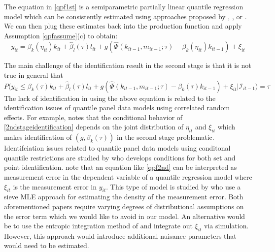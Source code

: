 \documentclass[11pt]{article}
\begin{document}
The equation in \eqref{qpf1st} is a semiparametric partially linear quantile regression model which can be consistently estimated using approaches proposed by \cite{Lee2003}, \cite{KOENKER1994}, or \cite{Chen2009}. We can then plug these estimates back into the production function and apply Assumption \eqref{qpfassume}(c) to obtain:
\begin{equation} \label{qpf2nd}
y_{it}=\beta_{k}(\eta_{it})k_{it}+\hat{\beta}_{l}(\tau)l_{it}+g(\hat{\Phi}(k_{it-1}, m_{it-1}; \tau)-\beta_{k}(\eta_{it})k_{it-1})+\xi_{it}
\end{equation}

The main challenge of the identification result in the second stage is that it is not true in general that
\begin{equation} \label{2ndstageidentification}
P\big(y_{it}\leq \beta_{k}(\tau)k_{it}+\hat{\beta}_{l}(\tau)l_{it}+g(\hat{\Phi}(k_{it-1}, m_{it-1}; \tau)-\beta_{k}(\tau)k_{it-1})+\xi_{it}|\mathcal{I}_{it-1}\big)=\tau
\end{equation}
The lack of identification in using the above equation is related to the identification issues of quantile panel data models using correlated random effects. For example, \cite{Canay2011} notes that the conditional behavior of \eqref{2ndstageidentification} depends on the joint distribution of $\eta_{it}$ and $\xi_{it}$ which makes identification of $(g, \beta_{k}(\tau))$ in the second stage problematic. Identifciation issues related to quantile panel data models using conditonal quantile restrictions are studied by \cite{Rosen2012} who develops conditions for both set and point identification. \cite{Cai2018} note that an equation like \eqref{qpf2nd} can be interpreted as measurement error in the dependent variable of a quantile regression model where $\xi_{it}$ is the measurement error in $y_{it}$. This type of model is studied by \cite{Hausman2019} who use a sieve MLE approach for estimating the density of the measurement error. Both aforementioned papers require varying degrees of distributional assumptions on the error term which we would like to avoid in our model. An alternative would be to use the entropic integration method of \cite{2014a} and integrate out $\xi_{it}$ via simulation. However, this approach would introduce additional nuisance parameters that would need to be estimated. 
\end{document}
